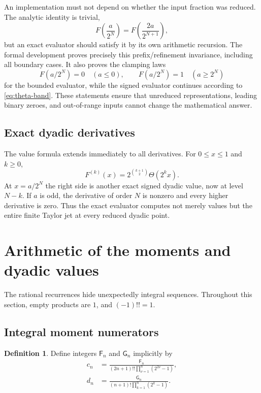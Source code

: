 \documentclass[11pt,oneside]{article}
\theoremstyle{definition}
\newtheorem{definition}[theorem]{Definition}
\theoremstyle{remark}
\newcommand{\Thetaf}{\Theta}
\begin{document}
An implementation must not depend on whether the input fraction was reduced.  The
analytic identity is trivial,
\begin{equation}\label{eq:dyadic-prefix-invariance}
  F\left(\frac a{2^N}\right)=F\left(\frac{2a}{2^{N+1}}\right),
\end{equation}
but an exact evaluator should satisfy it by its own arithmetic recursion.  The
formal development proves precisely this prefix/refinement invariance, including
all boundary cases.  It also proves the clamping laws
\begin{equation}\label{eq:dyadic-clamping}
  F(a/2^N)=0\quad(a\le0),
  \qquad
  F(a/2^N)=1\quad(a\ge2^N)
\end{equation}
for the bounded evaluator, while the signed evaluator continues according to
\eqref{eq:theta-band}.  These statements ensure that unreduced representations,
leading binary zeroes, and out-of-range inputs cannot change the mathematical
answer.

\subsection{Exact dyadic derivatives}

The value formula extends immediately to all derivatives.  For $0\le x\le1$ and
$k\ge0$,
\begin{equation}\label{eq:exact-dyadic-derivative}
  F^{(k)}(x)=2^{\binom{k+1}{2}}\Thetaf(2^kx).
\end{equation}
At $x=a/2^N$ the right side is another exact signed dyadic value, now at level
$N-k$.  If $a$ is odd, the derivative of order $N$ is nonzero and every higher
derivative is zero.  Thus the exact evaluator computes not merely values but the
entire finite Taylor jet at every reduced dyadic point.

\section{Arithmetic of the moments and dyadic values}\label{sec:arithmetic}

The rational recurrences hide unexpectedly integral sequences.  Throughout this
section, empty products are $1$, and $(-1)!!=1$.

\subsection{Integral moment numerators}

\begin{definition}\label{def:FG-numerators}
Define integers $\mathsf F_n$ and $\mathsf G_n$ implicitly by
\begin{align}
 c_n&=\frac{\mathsf F_n}
 {(2n+1)!!\prod_{\nu=1}^n(2^{2\nu}-1)},
 \label{eq:Fmathsf-def}\\
 d_n&=\frac{\mathsf G_n}
 {(n+1)!\prod_{k=1}^n(2^k-1)}.
 \label{eq:Gmathsf-def}
\end{align}
\end{definition}
\end{document}
